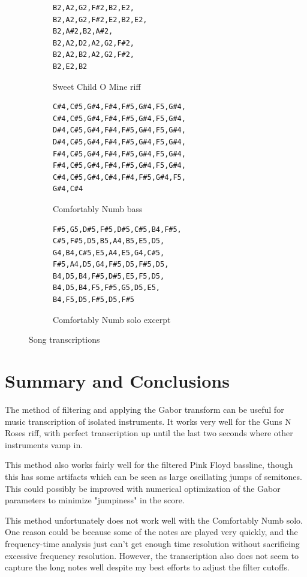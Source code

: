 \documentclass{article}
\begin{document}
\begin{figure}[]
	\centering
	\begin{subfigure}{.35\textwidth}
		\centering
		\begin{lstlisting}[basicstyle=\small]
B2,A2,G2,F#2,B2,E2,
B2,A2,G2,F#2,E2,B2,E2,
B2,A#2,B2,A#2,
B2,A2,D2,A2,G2,F#2,
B2,A2,B2,A2,G2,F#2,
B2,E2,B2
		\end{lstlisting}
		\caption{Sweet Child O Mine riff}
	\end{subfigure}%
	\begin{subfigure}{.35\textwidth}
		\centering
			\begin{lstlisting}[basicstyle=\small]
C#4,C#5,G#4,F#4,F#5,G#4,F5,G#4,
C#4,C#5,G#4,F#4,F#5,G#4,F5,G#4,
D#4,C#5,G#4,F#4,F#5,G#4,F5,G#4,
D#4,C#5,G#4,F#4,F#5,G#4,F5,G#4,
F#4,C#5,G#4,F#4,F#5,G#4,F5,G#4,
F#4,C#5,G#4,F#4,F#5,G#4,F5,G#4,
C#4,C#5,G#4,C#4,F#4,F#5,G#4,F5,
G#4,C#4
			\end{lstlisting}
		\caption{Comfortably Numb bass}
	\end{subfigure}
	\begin{subfigure}{.35\textwidth}
		\centering
		\begin{lstlisting}[basicstyle=\small]
F#5,G5,D#5,F#5,D#5,C#5,B4,F#5,
C#5,F#5,D5,B5,A4,B5,E5,D5,
G4,B4,C#5,E5,A4,E5,G4,C#5,
F#5,A4,D5,G4,F#5,D5,F#5,D5,
B4,D5,B4,F#5,D#5,E5,F5,D5,
B4,D5,B4,F5,F#5,G5,D5,E5,
B4,F5,D5,F#5,D5,F#5
		\end{lstlisting}
	\caption{Comfortably Numb solo excerpt}
		\end{subfigure}
	\caption{Song transcriptions}
	\label{fig:transcriptions}
\end{figure}
\newpage
\;
\;
\;
\;

\;
\;
\section{Summary and Conclusions}
The method of filtering and applying the Gabor transform can be useful for music transcription of isolated instruments. It works very well for the Guns N Roses riff, with perfect transcription up until the last two seconds where other instruments vamp in. 

This method also works fairly well for the filtered Pink Floyd bassline, though this has some artifacts which can be seen as large oscillating jumps of semitones. This could possibly be improved with numerical optimization of the Gabor parameters to minimize "jumpiness" in the score.

This method unfortunately does not work well with the Comfortably Numb solo. One reason could be because some of the notes are played very quickly, and the frequency-time analysis just can't get enough time resolution without sacrificing excessive frequency resolution. However, the transcription also does not seem to capture the long notes well despite my best efforts to adjust the filter cutoffs. 
\end{document}
